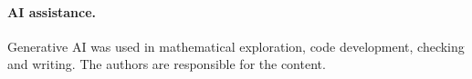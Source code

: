 \documentclass[11pt]{article}
\begin{document}
\paragraph{AI assistance.}
Generative AI was used in mathematical exploration, code development, checking and writing.
The authors are responsible for the content.

\clearpage
\appendix
{}



\end{document}
